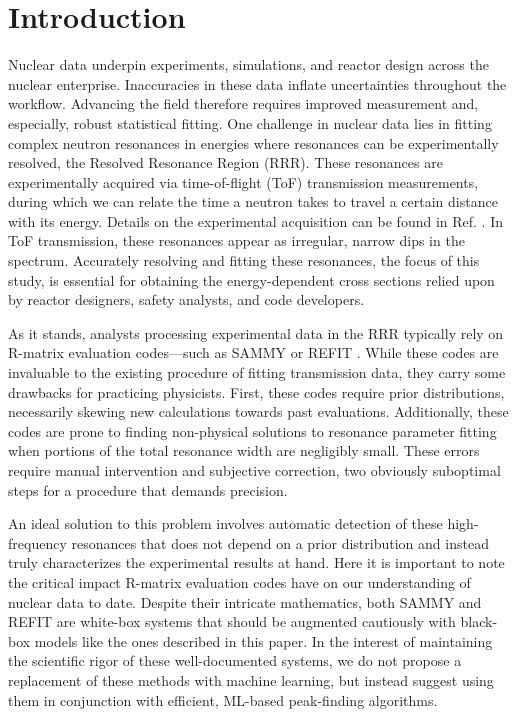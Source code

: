 \documentclass{style/nseJournal}
\begin{document}
\section{Introduction}\label{sec:intro}
Nuclear data underpin experiments, simulations, and reactor design across the nuclear enterprise. Inaccuracies in these data inflate uncertainties throughout the workflow. Advancing the field therefore requires improved measurement and, especially, robust statistical fitting. One challenge in nuclear data lies in fitting complex neutron resonances in energies where resonances can be experimentally resolved, the Resolved Resonance Region (RRR). These resonances are experimentally acquired via time-of-flight (ToF) transmission measurements, during which we can relate the time a neutron takes to travel a certain distance with its energy. Details on the experimental acquisition can be found in Ref. \cite{STAMATOPOULOS2022166166}. In ToF transmission, these resonances appear as irregular, narrow dips in the spectrum. Accurately resolving and fitting these resonances, the focus of this study, is essential for obtaining the energy-dependent cross sections relied upon by reactor designers, safety analysts, and code developers.


As it stands, analysts processing experimental data in the RRR typically rely on R-matrix evaluation codes---such as SAMMY \cite{nancym.larsonUpdatedUsersGuide2008} or REFIT \cite{moxon_1979}. While these codes are invaluable to the existing procedure of fitting transmission data, they carry some drawbacks for practicing physicists. First, these codes require prior distributions, necessarily skewing new calculations towards past evaluations. Additionally, these codes are prone to finding non-physical solutions to resonance parameter fitting when portions of the total resonance width are negligibly small. These errors require manual intervention and subjective correction, two obviously suboptimal steps for a procedure that demands precision. 

An ideal solution to this problem involves automatic detection of these high-frequency resonances that does not depend on a prior distribution and instead truly characterizes the experimental results at hand. Here it is important to note the critical impact R-matrix evaluation codes have on our understanding of nuclear data to date. Despite their intricate mathematics, both SAMMY and REFIT are white-box systems that should be augmented cautiously with black-box models like the ones described in this paper. In the interest of maintaining the scientific rigor of these well-documented systems, we do not propose a replacement of these methods with machine learning, but instead suggest using them in conjunction with efficient, ML-based peak-finding algorithms.
\end{document}

